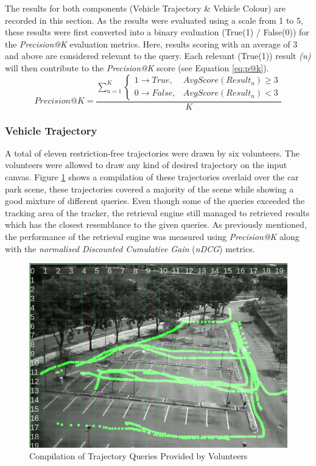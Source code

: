 The results for both components (Vehicle Trajectory \& Vehicle Colour) are
recorded in this section. As the results were evaluated using a scale from 1 to
5, these results were first converted into a binary evaluation (True(1) /
False(0)) for the \textit{Precision@K} evaluation metrics. Here, results
scoring with an average of 3 and above are considered relevant to the query.
Each relevant (True(1)) result \textit{(n)} will then contribute to the
\textit{Precision@K} score (see Equation \ref{eq:p@k}).
 \begin{equation}
\label{eq:p@k}
Precision@K =  \frac{\sum_{n=1}^K \begin{cases}1 \rightarrow True, & AvgScore
(Result_n)\geq 3\\0 \rightarrow False, & AvgScore(Result_n)< 3 \end{cases}} {K}
\end{equation}

\subsubsection{Vehicle Trajectory}
A total of eleven restriction-free trajectories were drawn by six volunteers.
The volunteers were allowed to draw any kind of desired trajectory on the input
canvas.
Figure \ref{fig:versionTwoTrajquery} shows a compilation of these trajectories
overlaid over the car park scene, these trajectories covered a majority of the
scene while showing a good mixture of different queries.
Even though some of the queries exceeded the tracking area of the tracker,
the retrieval engine still managed to retrieved results which has the closest
resemblance to the given queries. As previously mentioned, the performance of
the retrieval engine was measured using \textit{Precision@K} along with the
\textit{normalised Discounted Cumulative Gain} (\textit{nDCG}) metrics.

\begin{figure}[!t]
  \centering
    \includegraphics[width=0.8\linewidth]{image/retrievalTwo/trajquery.png}
  \caption{Compilation of Trajectory Queries Provided by Volunteers}
  \label{fig:versionTwoTrajquery}
\end{figure}

